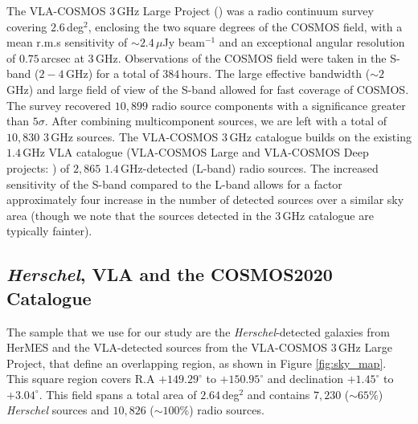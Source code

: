The VLA-COSMOS $3\,$GHz Large Project (\citealt{Smolcic_2017a, Smolcic_2017b, Smolcic_2017c}) was a radio continuum survey covering $2.6\,$deg$^{2}$, enclosing the two square degrees of the COSMOS field, with a mean r.m.s sensitivity of $\sim 2.4\,\mu$Jy beam$^{-1}$ and an exceptional angular resolution of $0.75\,$arcsec at $3\,$GHz. Observations of the COSMOS field were taken in the S-band ($2 - 4\,$GHz) for a total of $384\,$hours. The large effective bandwidth ($\sim 2\,$GHz) and large field of view of the S-band allowed for fast coverage of COSMOS. The survey recovered $10,899$ radio source components with a significance greater than $5\sigma$. After combining multicomponent sources, we are left with a total of $10,830$ $3\,$GHz sources. The VLA-COSMOS $3\,$GHz catalogue builds on the existing $1.4\,$GHz VLA catalogue (VLA-COSMOS Large and VLA-COSMOS Deep projects: \citealt{Schinnerer_2004, Schinnerer_2007, Schinnerer_2010}) of $2,865$ $1.4\,$GHz-detected (L-band) radio sources. The increased sensitivity of the S-band compared to the L-band allows for a factor approximately four increase in the number of detected sources over a similar sky area (though we note that the sources detected in the $3\,$GHz catalogue are typically fainter).

\subsection{\textit{Herschel}, VLA and the COSMOS2020 Catalogue}

The sample that we use for our study are the \textit{Herschel}-detected galaxies from HerMES and the VLA-detected sources from the VLA-COSMOS $3\,$GHz Large Project, that define an overlapping region, as shown in Figure \ref{fig:sky_map}. This square region covers R.A  $+149.29^{\circ}$ to $+150.95^{\circ}$ and declination $+1.45^{\circ}$ to $+3.04^{\circ}$. This field spans a total area of $2.64\,$deg$^2$ and contains $7,230$ ($\sim 65\%$) \textit{Herschel} sources and $10,826$ ($\sim 100\%$) radio sources.


